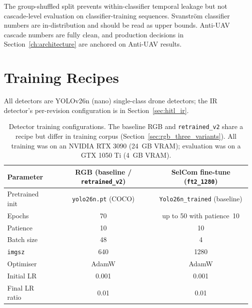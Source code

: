 The group-shuffled split prevents within-classifier temporal leakage but not cascade-level evaluation on classifier-training sequences. Svanstr\"om classifier numbers are in-distribution and should be read as upper bounds. Anti-UAV cascade numbers are fully clean, and production decisions in Section~\ref{ch:architecture} are anchored on Anti-UAV results.

\section{Training Recipes}
\label{sec:training_recipes}

All detectors are YOLOv26n (nano) single-class drone detectors; the IR detector's per-revision configuration is in Section~\ref{sec:hitl_ir}.

\begin{table}[htbp]
    \centering
    \caption{Detector training configurations. The baseline RGB and \texttt{retrained\_v2} share a recipe but differ in training corpus (Section~\ref{sec:rgb_three_variants}). All training was on an NVIDIA RTX 3090 (24~GB VRAM); evaluation was on a GTX 1050 Ti (4~GB VRAM).}
    \label{tab:training_recipes}
    \begin{tabular}{lcc}
        \toprule
        Parameter & RGB (baseline / \texttt{retrained\_v2}) & SelCom fine-tune (\texttt{ft2\_1280}) \\
        \midrule
        Pretrained init   & \texttt{yolo26n.pt} (COCO) & \texttt{Yolo26n\_trained} (baseline)        \\
        Epochs            & 70                         & up to 50 with patience~10                   \\
        Patience          & 10                         & 10                                          \\
        Batch size        & 48                         & 4                                           \\
        \texttt{imgsz}    & 640                        & 1280                                        \\
        Optimiser         & AdamW                      & AdamW                                       \\
        Initial LR        & 0.001                      & 0.001                                       \\
        Final LR ratio    & 0.01                       & 0.01                                        \\

\end{tabular}
\end{table}
